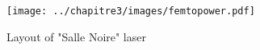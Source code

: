 \begin{figure}[H]
\centering
\texttt{[image: ../chapitre3/images/femtopower.pdf]}\\
\caption{\label{fig:femtopower}Layout of  "Salle Noire" laser}
\end{figure}


%
%
%
%
%
%
%
%
%
%
